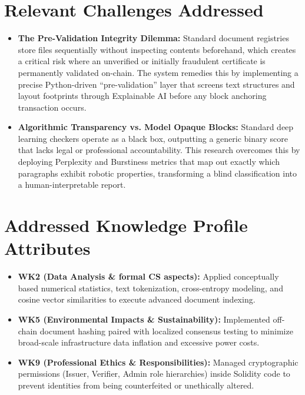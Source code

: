 \section{Relevant Challenges Addressed}
\begin{itemize}
    \item \textbf{The Pre-Validation Integrity Dilemma:} Standard document registries store files sequentially without inspecting contents beforehand, which creates a critical risk where an unverified or initially fraudulent certificate is permanently validated on-chain. The system remedies this by implementing a precise Python-driven ``pre-validation'' layer that screens text structures and layout footprints through Explainable AI before any block anchoring transaction occurs.
    \item \textbf{Algorithmic Transparency vs. Model Opaque Blocks:} Standard deep learning checkers operate as a black box, outputting a generic binary score that lacks legal or professional accountability. This research overcomes this by deploying Perplexity and Burstiness metrics that map out exactly which paragraphs exhibit robotic properties, transforming a blind classification into a human-interpretable report.
\end{itemize}

\section{Addressed Knowledge Profile Attributes}
\begin{itemize}
    \item \textbf{WK2 (Data Analysis \& formal CS aspects):} Applied conceptually based numerical statistics, text tokenization, cross-entropy modeling, and cosine vector similarities to execute advanced document indexing.
    \item \textbf{WK5 (Environmental Impacts \& Sustainability):} Implemented off-chain document hashing paired with localized consensus testing to minimize broad-scale infrastructure data inflation and excessive power costs.
    \item \textbf{WK9 (Professional Ethics \& Responsibilities):} Managed cryptographic permissions (Issuer, Verifier, Admin role hierarchies) inside Solidity code to prevent identities from being counterfeited or unethically altered.
\end{itemize}

